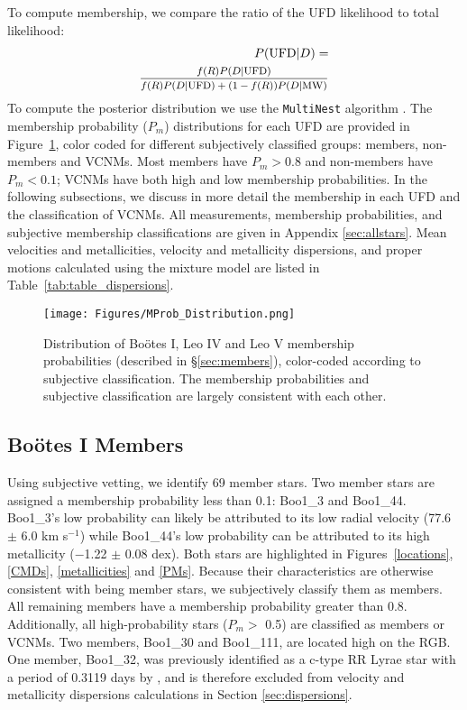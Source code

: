 \documentclass[twocolumn]{aastex63}
\newcommand{\code}[1]{\texttt{#1}\xspace}
\begin{document}
To compute membership, we compare the ratio of the UFD likelihood to total likelihood: 
\begin{equation}
\begin{aligned}
P(\mathrm{UFD}|D) = \\
\text{\footnotesize $\frac{f(R) P(D|\mathrm{UFD})}{f(R) P(D|\mathrm{UFD}) + (1-f (R)) P(D|\mathrm{MW})}$} 
\end{aligned}
\end{equation}
To compute the posterior distribution we use the \code{MultiNest} algorithm \citep{Feroz2008MNRAS.384..449F,Feroz2009MNRAS.398.1601F}. 
The membership probability ($P_m$) distributions for each UFD are provided in Figure~\ref{Pm}, color coded for different subjectively classified groups: members, non-members and VCNMs. Most members have $P_m > 0.8$ and non-members have $P_m < 0.1$; VCNMs have both high and low membership probabilities. In the following subsections, we discuss in more detail the membership in each UFD and the classification of VCNMs. All measurements, membership probabilities, and subjective membership classifications are given in Appendix \ref{sec:allstars}. Mean velocities and metallicities, velocity and metallicity dispersions, and proper motions calculated using the mixture model are listed in Table~\ref{tab:table_dispersions}.

\begin{figure} 
\centering
\texttt{[image: Figures/MProb\_Distribution.png]}
\caption{ Distribution of Bo{\"o}tes I, Leo IV and Leo V membership probabilities (described in \S\ref{sec:members}), color-coded according to subjective classification. The membership probabilities and subjective classification are largely consistent with each other. \label{Pm}}
\end{figure}

\subsection{Bo{\"o}tes I Members}
\label{sec:bootes_members}
Using subjective vetting, we identify 69 member stars. Two member stars are assigned a membership probability less than 0.1: Boo1\_3 and Boo1\_44. Boo1\_3's low probability can likely be attributed to its low radial velocity (77.6 $\pm$ 6.0 km s$^{-1}$) while Boo1\_44's low probability can be attributed to its high metallicity ($-$1.22 $\pm$ 0.08 dex). Both stars are highlighted in Figures~\ref{locations}, \ref{CMDs}, \ref{metallicities} and \ref{PMs}. Because their characteristics are otherwise consistent with being member stars, we subjectively classify them as members. All remaining members have a membership probability greater than 0.8. Additionally, all high-probability stars ($P_m >$ 0.5) are classified as members or VCNMs. Two members, Boo1\_30 and Boo1\_111, are located high on the RGB. One member, Boo1\_32, was previously identified as a c-type RR Lyrae star with a period of 0.3119 days by \citet{dal2006}, and is therefore excluded from velocity and metallicity dispersions calculations in Section \ref{sec:dispersions}.
\end{document}
